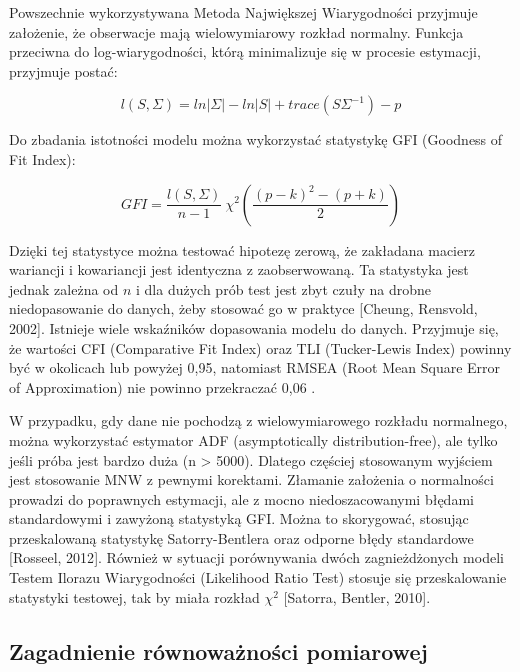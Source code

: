 \documentclass[12pt]{article}
\begin{document}
Powszechnie wykorzystywana Metoda Największej Wiarygodności przyjmuje założenie, że obserwacje mają wielowymiarowy rozkład normalny. Funkcja przeciwna do log-wiarygodności, którą minimalizuje się w procesie estymacji, przyjmuje postać:

\begin{equation}
\label{eq:loglikelihood}
l(S, \Sigma) = ln|\Sigma| - ln|S| + trace(S \Sigma^{-1}) - p
\end{equation}

Do zbadania istotności modelu można wykorzystać statystykę GFI (Goodness of Fit Index):

\begin{equation}
\label{eq:gfi}
GFI = \frac{l(S, \Sigma)}{n-1} ~\chi^2 (\frac{(p-k)^2 - (p+k)}{2})
\end{equation}

Dzięki tej statystyce można testować hipotezę zerową, że zakładana macierz wariancji i kowariancji jest identyczna z zaobserwowaną. Ta statystyka jest jednak zależna od \(n\) i dla dużych prób test jest zbyt czuły na drobne niedopasowanie do danych, żeby stosować go w praktyce {[}Cheung, Rensvold, 2002{]}. Istnieje wiele wskaźników dopasowania modelu do danych. Przyjmuje się, że wartości CFI (Comparative Fit Index) oraz TLI (Tucker-Lewis Index) powinny być w okolicach lub powyżej 0,95, natomiast RMSEA (Root Mean Square Error of Approximation) nie powinno przekraczać 0,06 \citep{HuBentler}.

W przypadku, gdy dane nie pochodzą z wielowymiarowego rozkładu normalnego, można wykorzystać estymator ADF (asymptotically distribution-free), ale tylko jeśli próba jest bardzo duża (n \textgreater{} 5000). Dlatego częściej stosowanym wyjściem jest stosowanie MNW z pewnymi korektami. Złamanie założenia o normalności prowadzi do poprawnych estymacji, ale z mocno niedoszacowanymi błędami standardowymi i zawyżoną statystyką GFI. Można to skorygować, stosując przeskalowaną statystykę Satorry-Bentlera oraz odporne błędy standardowe {[}Rosseel, 2012{]}. Również w sytuacji porównywania dwóch zagnieżdżonych modeli Testem Ilorazu Wiarygodności (Likelihood Ratio Test) stosuje się przeskalowanie statystyki testowej, tak by miała rozkład \(\chi^2\) {[}Satorra, Bentler, 2010{]}.

\hypertarget{zagadnienie-ruxf3wnowaux17cnoux15bci-pomiarowej}{%
\subsection{Zagadnienie równoważności pomiarowej}\label{zagadnienie-ruxf3wnowaux17cnoux15bci-pomiarowej}}
\end{document}
